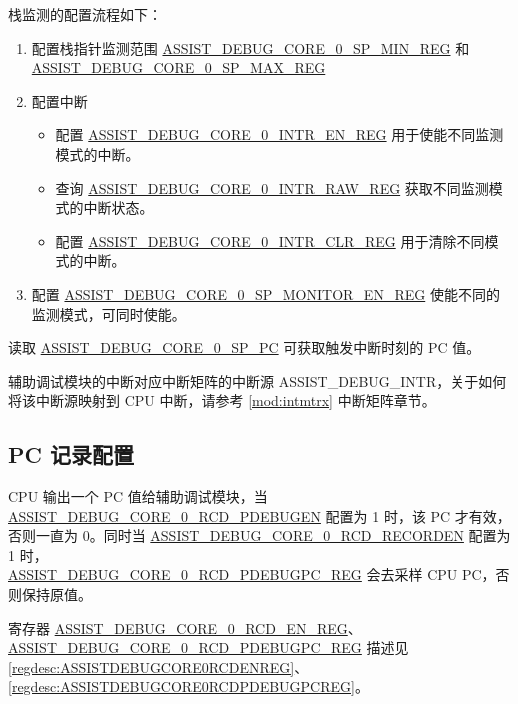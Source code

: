 \documentclass[main\_\_CN.tex]{subfiles}
\begin{document}
栈监测的配置流程如下：
\begin{enumerate}
    \item 配置栈指针监测范围 \hyperref[regdesc:ASSISTDEBUGCORE0SPMINREG]{ASSIST\_DEBUG\_CORE\_0\_SP\_MIN\_REG} 和 \hyperref[regdesc:ASSISTDEBUGCORE0SPMAXREG]{ASSIST\_DEBUG\_CORE\_0\_SP\_MAX\_REG}
    \item 配置中断
    \begin{itemize}
        \item 配置 \hyperref[regdesc:ASSISTDEBUGCORE0INTRENREG]{ASSIST\_DEBUG\_CORE\_0\_INTR\_EN\_REG} 用于使能不同监测模式的中断。
        \item 查询 \hyperref[regdesc:ASSISTDEBUGCORE0INTRRAWREG]{ASSIST\_DEBUG\_CORE\_0\_INTR\_RAW\_REG} 获取不同监测模式的中断状态。
        \item 配置 \hyperref[regdesc:ASSISTDEBUGCORE0INTRCLRREG]{ASSIST\_DEBUG\_CORE\_0\_INTR\_CLR\_REG} 用于清除不同模式的中断。
        \end{itemize}
    \item 配置 \hyperref[regdesc:ASSISTDEBUGCORE0SPMONITORENREG]{ASSIST\_DEBUG\_CORE\_0\_SP\_MONITOR\_EN\_REG} 使能不同的监测模式，可同时使能。
\end{enumerate}

读取 \hyperref[fielddesc:ASSISTDEBUGCORE0SPPC]{ASSIST\_DEBUG\_CORE\_0\_SP\_PC} 可获取触发中断时刻的 PC 值。

辅助调试模块的中断对应中断矩阵的中断源 ASSIST\_DEBUG\_INTR，关于如何将该中断源映射到 CPU 中断，请参考 \ref{mod:intmtrx} \textit{}中断矩阵章节。

\subsection{PC 记录配置}

CPU 输出一个 PC 值给辅助调试模块，当 \hyperref[fielddesc:ASSISTDEBUGCORE0RCDPDEBUGEN]{ASSIST\_DEBUG\_CORE\_0\_RCD\_PDEBUGEN} 配置为 1 时，该 PC 才有效，否则一直为 0。同时当 \hyperref[fielddesc:ASSISTDEBUGCORE0RCDRECORDEN]{ASSIST\_DEBUG\_CORE\_0\_RCD\_RECORDEN} 配置为 1 时，\\\hyperref[regdesc:ASSISTDEBUGCORE0RCDPDEBUGPCREG]{ASSIST\_DEBUG\_CORE\_0\_RCD\_PDEBUGPC\_REG} 会去采样 CPU PC，否则保持原值。

寄存器 \hyperref[regdesc:ASSISTDEBUGCORE0RCDENREG]{ASSIST\_DEBUG\_CORE\_0\_RCD\_EN\_REG}、\hyperref[regdesc:ASSISTDEBUGCORE0RCDPDEBUGPCREG]{ASSIST\_DEBUG\_CORE\_0\_RCD\_PDEBUGPC\_REG} 描述见 \ref{regdesc:ASSISTDEBUGCORE0RCDENREG}、\ref{regdesc:ASSISTDEBUGCORE0RCDPDEBUGPCREG}。
\end{document}

